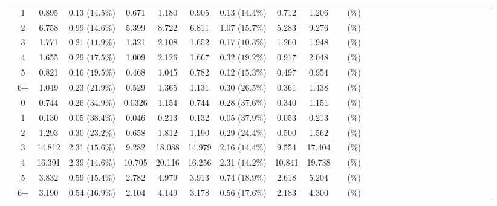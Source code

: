 \documentclass[a4paper 12pt]{article}
\numberwithin{equation}{section}
\begin{document}
\begin{tiny}
\begin{table}[h!]
\begin{tabular}{ccccccccccccccccccccccccccc}
\raisebox{1.5ex}{\bf cod 2018 Q1} & 1   & 0.895  & 0.13 ($14.5 \%$) & 0.671 & 1.180 & 0.905  & 0.13 ($14.4 \%$) &0.712 & 1.206 &  &  ($ \%$) \\[1ex]
& 2  & 6.758 & 0.99 ($14.6 \%$) & 5.399  & 8.722 & 6.811 & 1.07 ($15.7 \%$) &5.283 &9.276 & &  ($ \%$) \\[1ex]
& 3  & 1.771 & 0.21 ($11.9 \%$) & 1.321  & 2.108 & 1.652 & 0.17 ($10.3 \%$) &1.260 &1.948 & &  ($ \%$) \\[1ex]
& 4  &1.655  & 0.29 ($17.5 \%$) & 1.009  & 2.126 & 1.667 & 0.32 ($19.2 \%$) &0.917 &2.048 & &  ($ \%$) \\[1ex]
& 5  & 0.821 & 0.16 ($19.5 \%$) & 0.468  & 1.045 & 0.782 & 0.12 ($15.3 \%$) &0.497 &0.954 & &  ($ \%$) \\[1ex]
& 6+ & 1.049 & 0.23 ($21.9 \%$) & 0.529  & 1.365 & 1.131 & 0.30 ($26.5 \%$) &0.361 &1.438 & &  ($ \%$)\\[6.5ex]


\raisebox{1.5ex}{\bf saithe 2017 Q3} & 0& 0.744 &0.26 ($34.9 \%$) & 0.0326 & 1.154  & 0.744 &0.28 ($37.6 \%$) &0.340 &1.151 &  &  ($ \%$) \\[1ex]
 & 1  & 0.130   & 0.05 ($38.4 \%$) &0.046 &0.213  &0.132  &0.05   ($37.9 \%$) &0.053 &0.213 & &  ($ \%$) \\[1ex]
& 2  & 1.293  & 0.30 ($23.2 \%$) &0.658 & 1.812 &1.190  &0.29   ($24.4 \%$) &0.500 &1.562 & &  ($ \%$) \\[1ex]
& 3  & 14.812 & 2.31 ($15.6 \%$) &9.282 &18.088 &14.979 &2.16  ($14.4 \%$) &9.554 &17.404 & &  ($ \%$) \\[1ex]
& 4  & 16.391 &2.39 ($14.6 \%$) &10.705 &20.116 &16.256 &2.31 ($14.2 \%$) &10.841 &19.738 & &  ($ \%$) \\[1ex]
& 5 & 3.832  &0.59  ($15.4 \%$) &2.782 & 4.979 &3.913  &0.74  ($18.9 \%$)  &2.618 &5.204 & &  ($ \%$)\\[1ex]
& 6+ & 3.190  &0.54  ($16.9 \%$) &2.104 & 4.149 &3.178  &0.56  ($17.6 \%$)  &2.183 &4.300 & &  ($ \%$)\\[3.5ex]


\end{tabular}
\end{table}
\end{tiny}
\end{document}
